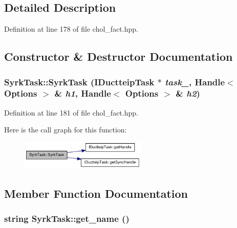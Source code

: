 \subsection{Detailed Description}


Definition at line 178 of file chol\_\-fact.hpp.

\subsection{Constructor \& Destructor Documentation}
\hypertarget{struct_syrk_task_a6c05d54b933ad7852df53801c91d56c9}{
\subsubsection[{SyrkTask}]{\setlength{\rightskip}{0pt plus 5cm}SyrkTask::SyrkTask ({\bf IDuctteipTask} $\ast$ {\em task\_\-}, \/  Handle$<$ {\bf Options} $>$ \& {\em h1}, \/  Handle$<$ {\bf Options} $>$ \& {\em h2})}}
\label{struct_syrk_task_a6c05d54b933ad7852df53801c91d56c9}


Definition at line 181 of file chol\_\-fact.hpp.

Here is the call graph for this function:\nopagebreak
\begin{figure}[H]
\begin{center}
\leavevmode
\includegraphics[width=170pt]{struct_syrk_task_a6c05d54b933ad7852df53801c91d56c9_cgraph}
\end{center}
\end{figure}


\subsection{Member Function Documentation}
\hypertarget{struct_syrk_task_a7cf940cf2e3a008e1c7d478d7da78042}{
\subsubsection[{get\_\-name}]{\setlength{\rightskip}{0pt plus 5cm}string SyrkTask::get\_\-name ()}}
\label{struct_syrk_task_a7cf940cf2e3a008e1c7d478d7da78042}



